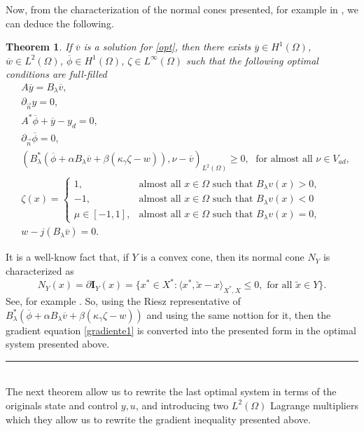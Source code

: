 \documentclass[11pt,a4paper]{amsart}
\newcommand{\kw}{\rule{2mm}{2mm}}
\newcommand{\om}{\Omega}
\renewenvironment{proof}{{Proof.}}{\hfill\kw}
\newtheorem{theorem}{{Theorem}}
\begin{document}
Now, from the characterization of the normal cones presented, for example in \cite{rock}, we can deduce the following.
\begin{theorem} 
	If $\overline{v}$ is a solution for \eqref{opt}, then there exists $\overline{y}\in H^1(\om)$, $\overline{w}\in L^2(\om)$, $\overline{\phi}\in H^1(\om)$, $\zeta\in L^\infty(\om)$ such that the following optimal conditions are full-filled
	\begin{equation}\label{optii1}
    \begin{split}
	&A\overline{y}=B_{\lambda}\overline{v}, \\
	&\partial_{\vec{n}} y=0, \\
	&A^*\overline{\phi}+\overline{y}-y_d=0,\\
	&\partial_{\vec{n}}\overline{\phi}=0,\\
	&(B_{
	\lambda}^*(\overline{\phi}+\alpha B_{\lambda}\overline{v}+\beta( \kappa_{\gamma}\zeta-w)),\nu-\overline{v})_{L^2(\om)}\ge 0, \;\mbox{ for almost all }\nu \in V_{ad},\\
	&\zeta(x)=\begin{cases}
		1, & \mbox{almost all }x\in \om \mbox{ such that } B_{\lambda}v(x)>0,\\
		-1, & \mbox{almost all }x\in \om \mbox{ such that }B_{\lambda}v(x)<0\\
		\mu \in [-1,1], &\mbox{almost all }x\in \om \mbox{ such that } B_{\lambda}v(x)=0,
	\end{cases}\\
	&w-j(B_{\lambda}\overline{v})=0.
\end{split}
\end{equation}
\end{theorem}

\begin{proof}
 It is a well-know fact that, if $Y$ is a convex cone, then its normal cone $N_{Y}$ is characterized as
\[
    N_{Y}(x)=\partial \mathbf{I}_{Y}(x)=\{x^*\in X^*:\langle x^*, \tilde{x}-x\rangle_{X^*,X}\le 0,  \mbox{ for all }\tilde{x}\in Y\}.
\]
See, for example \cite{rock}. So, using the Riesz representative of $B_{
	\lambda}^*(\overline{\phi}+\alpha B_{\lambda}\overline{v}+\beta( \kappa_{\gamma}\zeta-w))$ and using the same nottion for it, then the gradient equation \eqref{gradiente1} is converted into the presented form in the optimal system presented above.
\end{proof}\\

The next theorem allow us to rewrite the last optimal system in terms of the originals state and control $y, u$, and introducing two $L^{2}(\om)$ Lagrange multipliers which they allow us to rewrite the gradient inequality presented above.
\end{document}
